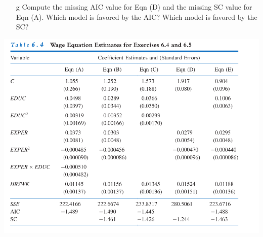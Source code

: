 \documentclass[xcolor={dvipsnames}]{beamer}
\begin{document}
\begin{frame}[allowframebreaks]{6.4}
\begin{itemize}
		\item[g] Compute the missing AIC value for Eqn (D) and the missing SC value for Eqn (A). Which model is favored by the AIC? Which model is favored by the SC?
	\end{itemize}
	\includegraphics{Table6_4.png}
	
\end{frame}
\end{document}

